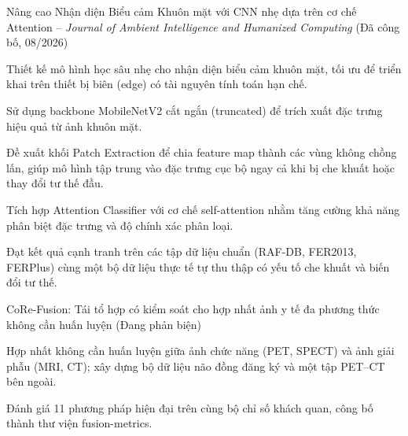 \begin{cventries}

  \cventry
    {Nâng cao Nhận diện Biểu cảm Khuôn mặt với CNN nhẹ dựa trên cơ chế Attention -- \emph{Journal of Ambient Intelligence and Humanized Computing} (Đã công bố, 08/2026)}
    {}
    {
      \begin{cvitems}
        \item {Thiết kế mô hình học sâu nhẹ cho nhận diện biểu cảm khuôn mặt, tối ưu để triển khai trên thiết bị biên (edge) có tài nguyên tính toán hạn chế.}
        \item {Sử dụng backbone MobileNetV2 cắt ngắn (truncated) để trích xuất đặc trưng hiệu quả từ ảnh khuôn mặt.}
        \item {Đề xuất khối Patch Extraction để chia feature map thành các vùng không chồng lấn, giúp mô hình tập trung vào đặc trưng cục bộ ngay cả khi bị che khuất hoặc thay đổi tư thế đầu.}
        \item {Tích hợp Attention Classifier với cơ chế self-attention nhằm tăng cường khả năng phân biệt đặc trưng và độ chính xác phân loại.}
        \item {Đạt kết quả cạnh tranh trên các tập dữ liệu chuẩn (RAF-DB, FER2013, FERPlus) cùng một bộ dữ liệu thực tế tự thu thập có yếu tố che khuất và biến đổi tư thế.}
      \end{cvitems}
    }

\end{cventries}

\vspace{10pt}

\begin{cventries}

  \cventry
    {CoRe-Fusion: Tái tổ hợp có kiểm soát cho hợp nhất ảnh y tế đa phương thức không cần huấn luyện (Đang phản biện)}
    {}
    {
      \begin{cvitems}
        \item {Hợp nhất không cần huấn luyện giữa ảnh chức năng (PET, SPECT) và ảnh giải phẫu (MRI, CT); xây dựng bộ dữ liệu não đồng đăng ký và một tập PET--CT bên ngoài.}
        \item {Đánh giá 11 phương pháp hiện đại trên cùng bộ chỉ số khách quan, công bố thành thư viện fusion-metrics.}
      \end{cvitems}
    }

\end{cventries}


